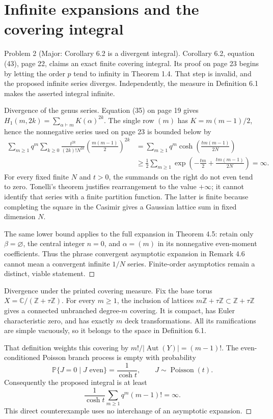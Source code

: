 \documentclass[10pt]{article}
\begin{document}
\section*{Infinite expansions and the covering integral}
Problem 2 (Major: Corollary 6.2 is a divergent integral).  Corollary 6.2, equation (43), page 22, claims an exact finite covering integral. Its proof on page 23 begins by letting the order \(p\) tend to infinity in Theorem 1.4. That step is invalid, and the proposed infinite series diverges. Independently, the measure in Definition 6.1 makes the asserted integral infinite.\par
Divergence of the genus series. Equation (35) on page 19 gives \(H_1(m,2k)=\sum_{\alpha\vdash m}K(\alpha)^{2k}\). The single row \((m)\) has \(K=m(m-1)/2\), hence the nonnegative series used on page 23 is bounded below by \[\begin{aligned}
\sum_{m\geq1}q^m\sum_{k\geq0}
 \frac{t^{2k}}{(2k)!N^{2k}}\left(\frac{m(m-1)}2\right)^{2k}
&=\sum_{m\geq1}q^m\cosh\left(\frac{tm(m-1)}{2N}\right)\\
&\geq\frac12\sum_{m\geq1}
 \exp\left(-\frac{tm}{2}+\frac{tm(m-1)}{2N}\right)=\infty .\end{aligned}\] For every fixed finite \(N\) and \(t>0\), the summands on the right do not even tend to zero. Tonelli’s theorem justifies rearrangement to the value \(+\infty\); it cannot identify that series with a finite partition function. The latter is finite because completing the square in the Casimir gives a Gaussian lattice sum in fixed dimension \(N\).\par
The same lower bound applies to the full expansion in Theorem 4.5: retain only \(\beta=\varnothing\), the central integer \(n=0\), and \(\alpha=(m)\) in its nonnegative even-moment coefficients. Thus the phrase convergent asymptotic expansion in Remark 4.6 cannot mean a convergent infinite \(1/N\) series. Finite-order asymptotics remain a distinct, viable statement. ◻\par
Divergence under the printed covering measure. Fix the base torus \(X=\mathbb C/(\mathbb Z+\tau\mathbb Z)\). For every \(m\geq1\), the inclusion of lattices \(m\mathbb Z+\tau\mathbb Z\subset\mathbb Z+\tau\mathbb Z\) gives a connected unbranched degree-\(m\) covering. It is compact, has Euler characteristic zero, and has exactly \(m\) deck transformations. All its ramifications are simple vacuously, so it belongs to the space in Definition 6.1.\par
That definition weights this covering by \(m!/|\operatorname{Aut}(Y)|=(m-1)!\). The even-conditioned Poisson branch process is empty with probability \[\mathbb P\{J=0\mid J\text{ even}\}=\frac1{\cosh t},
\qquad J\sim\operatorname{Poisson}(t).\] Consequently the proposed integral is at least \[\frac1{\cosh t}\sum_{m\geq1}q^m(m-1)!=\infty.\] This direct counterexample uses no interchange of an asymptotic expansion. ◻\par
\end{document}

